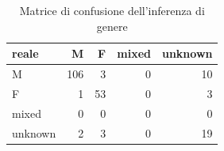\begin{table}
\centering
\caption{Matrice di confusione dell'inferenza di genere}
\label{tab:t2_validazione_confusione}
\begin{tabular}{lrrrr}
\toprule
  reale &   M &  F &  mixed &  unknown \\
\midrule
      M & 106 &  3 &      0 &       10 \\
      F &   1 & 53 &      0 &        3 \\
  mixed &   0 &  0 &      0 &        0 \\
unknown &   2 &  3 &      0 &       19 \\
\bottomrule
\end{tabular}
\end{table}
